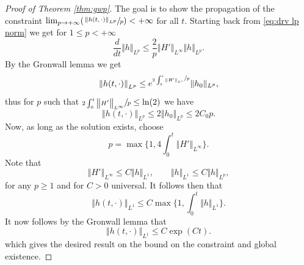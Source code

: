 \documentclass[JEP,XML,SOM,Unicode,NoFloatCountersInSection,published]{cedram}
\newcommand{\Psfrac}[2]{(\sfrac{#1}{#2})}
\theoremstyle{plain}
\theoremstyle{definition}
\begin{document}

\begin{proof}[Proof of Theorem \ref{thm:gwp}]
The goal is to show the propagation of the constraint $\lim_{p\to+\infty}\Psfrac{\left \Vert h(t,\cdot)\right\Vert_{L^p}}{p}<+\infty$ for all $t$. Starting back from \eqref{eq:drv lp norm} we get for $1\leq p<+\infty$
\[
\frac{d}{dt}\Vert h\Vert_{L^{p}}\leq \frac{2}{p}\left\Vert H'\right\Vert_{L^{\infty}}\Vert h\Vert_{L^{p}}.
\]
By the Gronwall lemma we get
\[
\left\Vert h(t,\cdot)\right\Vert_{L^{p}}\leq e^{\sfrac{2\int_0^t\left\Vert H'\right\Vert_{L^{\infty}}}{p}}\Vert h_0\Vert_{L^{p}},
\]
thus for $p$ such that $\sfrac{2\int_0^t\left\Vert H'\right\Vert_{L^{\infty}}}{p}\leq \ln(2)$ we have
\[
\left\Vert h(t,\cdot)\right\Vert_{L^{p}}\leq 2 \left\Vert h_0\right\Vert_{L^{p}}\leq 2C_0 p.
\]
Now, as long as the solution exists, choose
\[\textstyle
p=\max\{1,4\int_0^t \left\Vert H'\right\Vert_{L^\infty}\}.
\]
Note that
\[
\left\Vert H' \right\Vert_{L^\infty}\leq C \Vert h\Vert_{L^1},\qquad \Vert h\Vert_{L^1}\leq C\Vert h\Vert_{L^{p}},
\]
for any $p\geq 1$ and for $C>0$ universal.
It follows then that\vspace*{-3pt}
\[\textstyle
\left\Vert h(t,\cdot)\right\Vert_{L^1}\leq C \max\{1,\int_{0}^t\Vert h\Vert_{L^1}\}.
\]
It now follows by the Gronwall lemma that\vspace*{-3pt}\enlargethispage{\baselineskip}
\[
\left\Vert h(t,\cdot)\right\Vert_{L^1}\leq C\exp(Ct).
\]
which gives the desired result on the bound on the constraint and global existence.
\end{proof}

\label{sec:cvg moll}
\end{document}
